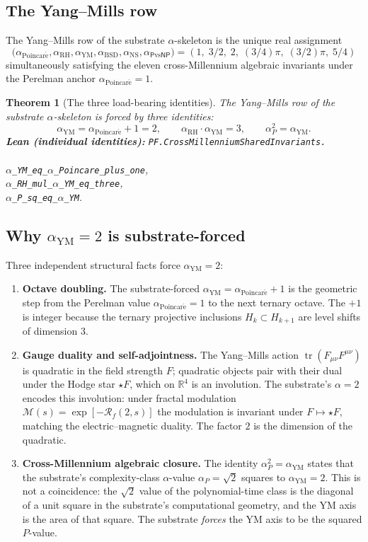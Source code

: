 \documentclass[11pt,a4paper]{article}
\theoremstyle{plain}
\newtheorem{theorem}{Theorem}[section]
\theoremstyle{definition}
\DeclareMathOperator{\Tr}{tr}
\newcommand{\R}{\mathbb{R}}
\newcommand{\Rf}{\mathcal{R}_f}
\newcommand{\Mfm}{\mathcal{M}}
\newcommand{\aYM}{\alpha_{\mathrm{YM}}}
\newcommand{\aRH}{\alpha_{\mathrm{RH}}}
\newcommand{\aP}{\alpha_{P}}
\newcommand{\aPoinc}{\alpha_{\mathrm{Poincar\acute e}}}
\newcommand{\aBSD}{\alpha_{\mathrm{BSD}}}
\newcommand{\aNS}{\alpha_{\mathrm{NS}}}
\begin{document}
\subsection{The Yang--Mills row}

The Yang--Mills row of the substrate $\alpha$-skeleton is the unique
real assignment
\[
\bigl(\aPoinc, \aRH, \aYM, \aBSD, \aNS, \alpha_{\mathsf{P}\mathrm{vs}\mathsf{NP}}\bigr)
= (1,\; 3/2,\; 2,\; (3/4)\pi,\; (3/2)\pi,\; 5/4)
\]
simultaneously satisfying the eleven cross-Millennium algebraic
invariants under the Perelman anchor $\aPoinc = 1$.

\begin{theorem}[The three load-bearing identities]
\label{thm:loadbearing}
The Yang--Mills row of the substrate $\alpha$-skeleton is forced by
three identities:
\[
\boxed{\;\aYM = \aPoinc + 1 = 2,
\qquad \aRH \cdot \aYM = 3,
\qquad \aP^{2} = \aYM.\;}
\]
\textbf{Lean (individual identities):}
\texttt{PF.CrossMillenniumSharedInvariants.\\\\
$\alpha$\_YM\_eq\_$\alpha$\_Poincare\_plus\_one},\\
\texttt{$\alpha$\_RH\_mul\_$\alpha$\_YM\_eq\_three},\\
\texttt{$\alpha$\_P\_sq\_eq\_$\alpha$\_YM}.
\end{theorem}

\subsection{Why $\aYM = 2$ is substrate-forced}

Three independent structural facts force $\aYM = 2$:

\begin{enumerate}[label=\textbf{S\arabic*.},leftmargin=*]
\item \textbf{Octave doubling.} The substrate-forced
$\aYM = \aPoinc + 1$ is the geometric step from the Perelman value
$\aPoinc = 1$ to the next ternary octave. The $+1$ is integer because
the ternary projective inclusions $H_{k} \subset H_{k+1}$ are level
shifts of dimension $3$.
\item \textbf{Gauge duality and self-adjointness.} The Yang--Mills
action $\Tr(F_{\mu\nu}F^{\mu\nu})$ is quadratic in the field strength
$F$; quadratic objects pair with their dual under the Hodge star
$\star F$, which on $\R^{4}$ is an involution. The substrate's
$\alpha = 2$ encodes this involution: under fractal modulation $\Mfm(s)
= \exp[-\Rf(2, s)]$ the modulation is invariant under $F \mapsto
\star F$, matching the electric--magnetic duality. The factor $2$ is
the dimension of the quadratic.
\item \textbf{Cross-Millennium algebraic closure.} The identity
$\aP^{2} = \aYM$ states that the substrate's complexity-class
$\alpha$-value $\aP = \sqrt{2}$ squares to $\aYM = 2$. This is not a
coincidence: the $\sqrt{2}$ value of the polynomial-time class is the
diagonal of a unit square in the substrate's computational geometry,
and the YM axis is the area of that square. The substrate
\emph{forces} the YM axis to be the squared $P$-value.
\end{enumerate}
\end{document}

